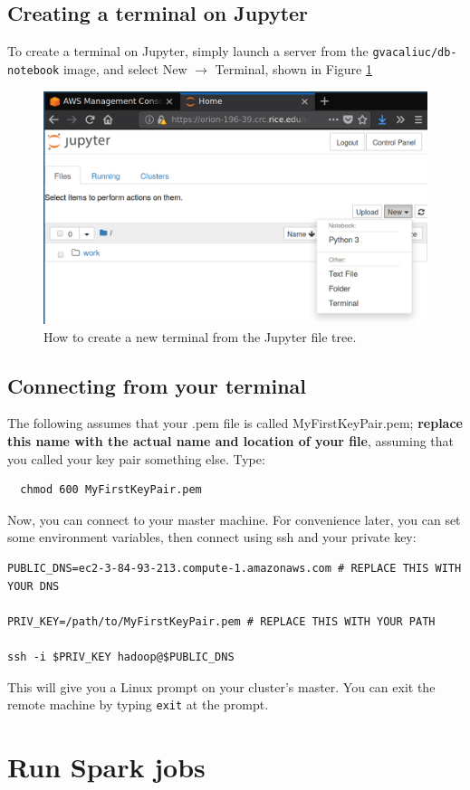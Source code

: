 \documentclass[11pt]{article}
\renewcommand\:{\colon} %
\begin{document}
\subsection{Creating a terminal on Jupyter}

To create a terminal on Jupyter, simply launch a server from the
\texttt{gvacaliuc/db-notebook} image, and select New $\rightarrow$ Terminal,
shown in Figure
\ref{fig:jupyter-new-terminal}

\begin{figure}[htpb]
  \centering
  \includegraphics[width=0.4\linewidth]{./figs/jupyter-new-terminal.png}
  \caption{How to create a new terminal from the Jupyter file tree.}
  \label{fig:jupyter-new-terminal}
\end{figure}

\subsection{Connecting from your terminal}

The following assumes that your .pem file is called MyFirstKeyPair.pem;
\textbf{replace this name with the actual name and location of your file},
assuming that you called your key pair something else. Type:

\begin{verbatim}
  chmod 600 MyFirstKeyPair.pem
\end{verbatim}

Now, you can connect to your master machine.  For convenience later, you can
set some environment variables, then connect using ssh and your private key:
\begin{verbatim}
PUBLIC_DNS=ec2-3-84-93-213.compute-1.amazonaws.com # REPLACE THIS WITH YOUR DNS

PRIV_KEY=/path/to/MyFirstKeyPair.pem # REPLACE THIS WITH YOUR PATH

ssh -i $PRIV_KEY hadoop@$PUBLIC_DNS
\end{verbatim}

This will give you a Linux prompt on your cluster's master. You can exit the
remote machine by typing \texttt{exit} at the prompt.

\section{Run Spark jobs}
\end{document}
